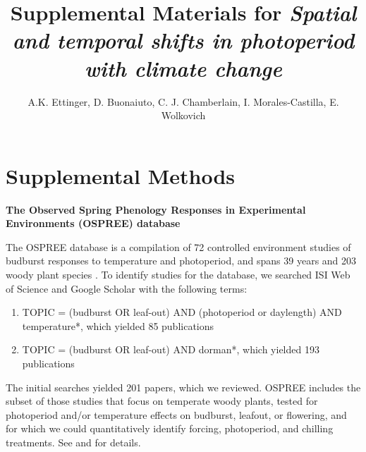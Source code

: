 \documentclass{article}
\begin{document}
 
\title{Supplemental Materials for \emph{Spatial and temporal shifts in photoperiod with climate change}} 

\author{A.K. Ettinger, D. Buonaiuto, C. J. Chamberlain, I. Morales-Castilla, E. Wolkovich}
\maketitle  %

\renewcommand{\thetable}{S\arabic{table}}
\renewcommand{\thefigure}{S\arabic{figure}}

\section*{Supplemental Methods}

\par \textbf{The Observed Spring Phenology Responses in Experimental Environments (OSPREE) database}
\par The OSPREE database is a compilation of 72 controlled environment studies of budburst responses to temperature and photoperiod, and spans 39 years and 203 woody plant species \citep{wolkovich2019}.  To identify studies for the database, we searched ISI Web of Science and Google Scholar with the following terms: 
\begin{enumerate}
\item TOPIC = (budburst OR leaf-out) AND (photoperiod or daylength) AND temperature*, which yielded 85 publications

\item TOPIC = (budburst OR leaf-out) AND dorman*, which yielded 193 publications
\end{enumerate}

The initial searches yielded 201 papers, which we reviewed. OSPREE includes the subset of those studies that focus on temperate woody plants, tested for photoperiod and/or temperature effects on budburst, leafout, or flowering, and for which we could quantitatively identify forcing, photoperiod, and chilling treatments. See \citet{ettinger2020} and \citet{wolkovich2019} for details.
\end{document}
